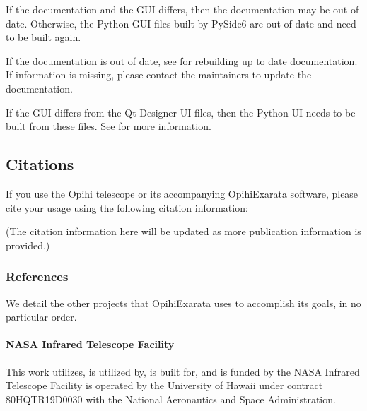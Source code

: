 \documentclass[letterpaper,11pt,english]{sphinxmanual}
\begin{document}
\sphinxAtStartPar
If the documentation and the GUI differs, then the documentation may be out of
date. Otherwise, the Python GUI files built by PySide6 are out of date and
need to be built again.

\sphinxAtStartPar
If the documentation is out of date, see
{\hyperref[\detokenize{technical/installation/documentation:technical-installation-documentation}]{}} for rebuilding up to date
documentation. If information is missing, please contact the maintainers to
update the documentation.

\sphinxAtStartPar
If the GUI differs from the Qt Designer UI files, then the Python UI needs to
be built from these files. See
{\hyperref[\detokenize{technical/architecture/graphical_user_interface:technical-architecture-graphical-user-interface-building-ui-files}]{}} for
more information.

\sphinxstepscope


\subsection{Citations}
\label{\detokenize{user/citations:citations}}\label{\detokenize{user/citations:user-citations}}\label{\detokenize{user/citations::doc}}
\sphinxAtStartPar
If you use the Opihi telescope or its accompanying OpihiExarata software, please cite your usage using the following citation information:

\sphinxAtStartPar
(The citation information here will be updated as more publication
information is provided.)


\subsubsection{References}
\label{\detokenize{user/citations:references}}
\sphinxAtStartPar
We detail the other projects that OpihiExarata uses to accomplish its goals,
in no particular order.


\paragraph{NASA Infrared Telescope Facility}
\label{\detokenize{user/citations:nasa-infrared-telescope-facility}}
\sphinxAtStartPar
This work utilizes, is utilized by, is built for, and is funded by the NASA
Infrared Telescope Facility is operated by the University of Hawaii under
contract 80HQTR19D0030 with the National Aeronautics and Space Administration.
\end{document}

